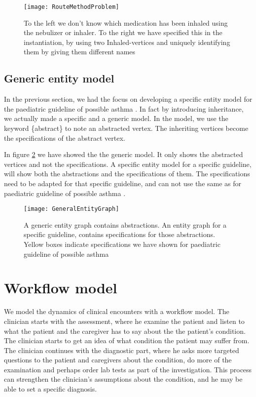 \begin{figure}[h!]
	\texttt{[image: RouteMethodProblem]}
	\caption {To the left we don't know which medication has been inhaled using the nebulizer or inhaler. To the right we have specified this in the instantiation, by using two Inhaled-vertices and uniquely identifying them by giving them different names}
		\label{fig:RouteMethodProblem}
\end{figure}

\subsection{Generic entity model}
In the previous section, we had the focus on developing a specific entity model for the paediatric guideline of possible asthma \parencite{RepublicofKeny2016}. In fact by introducing inheritance, we actually made a specific and a generic model. In the model, we use the keyword \{abstract\} to note an abstracted vertex. The inheriting vertices become the specifications of the abstract vertex. 

In figure \ref{fig:GeneralEntityGraph} we have showed the the generic model. It only shows the abstracted vertices and not the specifications. A specific entity model for a specific guideline, will show both the abstractions and the specifications of them. The specifications need to be adapted for that specific guideline, and can not use the same as for paediatric guideline of possible asthma \parencite{RepublicofKeny2016}.

\begin{figure}[h!]
	\texttt{[image: GeneralEntityGraph]}
	\caption {A generic entity graph contains abstractions. An entity graph for a specific guideline, contains specifications for those abstractions. Yellow boxes indicate specifications we have shown for paediatric guideline of possible asthma \parencite{RepublicofKeny2016}}
	\label{fig:GeneralEntityGraph}
\end{figure}

\section{Workflow model}
We model the dynamics of clinical encounters with a workflow model. The clinician starts with the assessment, where he examine the patient and listen to what the patient and the caregiver has to say about the the patient's condition. The clinician starts to get an idea of what condition the patient may suffer from. The clinician continues with the diagnostic part, where he asks more targeted questions to the patient and caregivers about the condition, do more of the examination and perhaps order lab tests as part of the investigation. This process can strengthen the clinician's assumptions about the condition, and he may be able to set a specific diagnosis.

